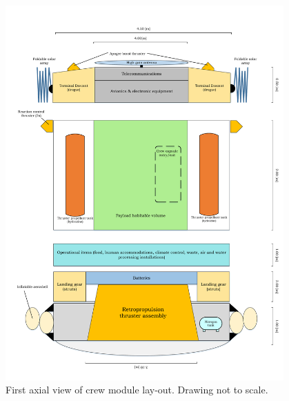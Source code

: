 \begin{figure}[h]
		\centering
		\includegraphics[width=0.95\textwidth]{./Figure/CrewModule/Axialview.pdf}
		\caption[First axial view of crew module lay-out]{First axial view of crew module lay-out. Drawing not to scale.}
		\label{fig:axview}
\end{figure}

